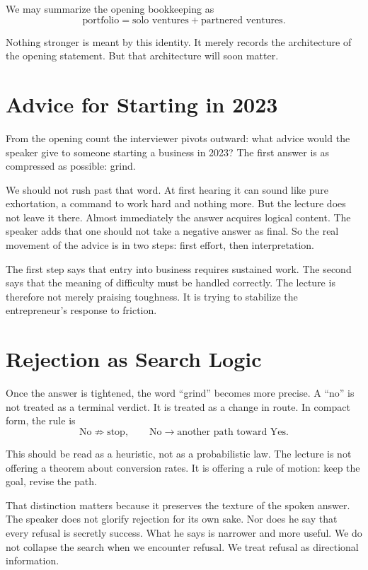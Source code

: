 We may summarize the opening bookkeeping as
\begin{equation}
\text{portfolio} = \text{solo ventures} + \text{partnered ventures}.
\end{equation}

Nothing stronger is meant by this identity. It merely records the architecture of the opening statement. But that architecture will soon matter.

\section{Advice for Starting in 2023}

From the opening count the interviewer pivots outward: what advice would the speaker give to someone starting a business in 2023? The first answer is as compressed as possible: grind.

We should not rush past that word. At first hearing it can sound like pure exhortation, a command to work hard and nothing more. But the lecture does not leave it there. Almost immediately the answer acquires logical content. The speaker adds that one should not take a negative answer as final. So the real movement of the advice is in two steps: first effort, then interpretation.

The first step says that entry into business requires sustained work. The second says that the meaning of difficulty must be handled correctly. The lecture is therefore not merely praising toughness. It is trying to stabilize the entrepreneur's response to friction.

\section{Rejection as Search Logic}

Once the answer is tightened, the word ``grind'' becomes more precise. A ``no'' is not treated as a terminal verdict. It is treated as a change in route. In compact form, the rule is
\begin{equation}
\text{No} \not\Rightarrow \text{stop},
\qquad
\text{No} \to \text{another path toward Yes}.
\end{equation}

This should be read as a heuristic, not as a probabilistic law. The lecture is not offering a theorem about conversion rates. It is offering a rule of motion: keep the goal, revise the path.

That distinction matters because it preserves the texture of the spoken answer. The speaker does not glorify rejection for its own sake. Nor does he say that every refusal is secretly success. What he says is narrower and more useful. We do not collapse the search when we encounter refusal. We treat refusal as directional information.

